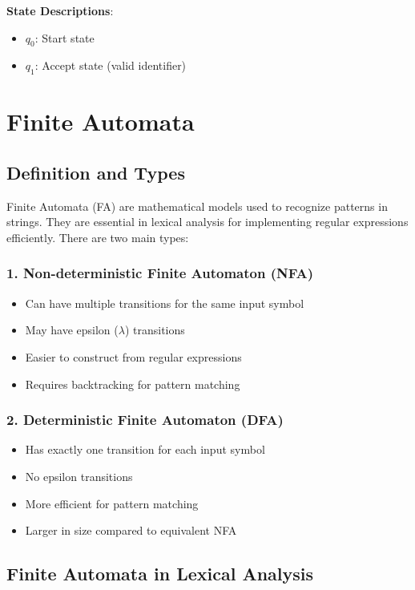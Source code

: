 \documentclass[12pt,a4paper]{article}
\begin{document}
\textbf{State Descriptions}:
\begin{itemize}
    \item \textbf{$q_0$}: Start state
    \item \textbf{$q_1$}: Accept state (valid identifier)
\end{itemize}

\section{Finite Automata}

\subsection{Definition and Types}

Finite Automata (FA) are mathematical models used to recognize patterns in strings. They are essential in lexical analysis for implementing regular expressions efficiently. There are two main types:

\subsubsection{1. Non-deterministic Finite Automaton (NFA)}
\begin{itemize}
    \item Can have multiple transitions for the same input symbol
    \item May have epsilon ($\lambda$) transitions
    \item Easier to construct from regular expressions
    \item Requires backtracking for pattern matching
\end{itemize}

\subsubsection{2. Deterministic Finite Automaton (DFA)}
\begin{itemize}
    \item Has exactly one transition for each input symbol
    \item No epsilon transitions
    \item More efficient for pattern matching
    \item Larger in size compared to equivalent NFA
\end{itemize}

\subsection{Finite Automata in Lexical Analysis}
\end{document}
